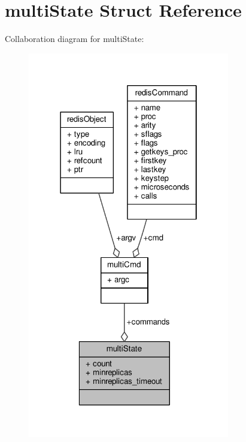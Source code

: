 \hypertarget{structmultiState}{}\section{multi\+State Struct Reference}
\label{structmultiState}


Collaboration diagram for multi\+State\+:\nopagebreak
\begin{figure}[H]
\begin{center}
\leavevmode
\includegraphics[width=250pt]{structmultiState__coll__graph}
\end{center}
\end{figure}
